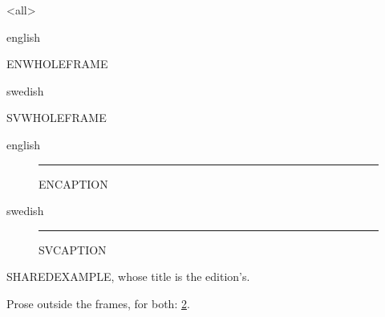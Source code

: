 \mode<all>
\begin{onlyin}{english}
\begin{frame}
ENWHOLEFRAME
\end{frame}
\end{onlyin}
\begin{onlyin}{swedish}
\begin{frame}
SVWHOLEFRAME
\end{frame}
\end{onlyin}
\mode*

\begin{onlyin}{english}
\begin{figure}
\rule{1cm}{1cm}
\caption{ENCAPTION}\label{fig:same}
\end{figure}
\end{onlyin}
\begin{onlyin}{swedish}
\begin{figure}
\rule{1cm}{1cm}
\caption{SVCAPTION}\label{fig:same}
\end{figure}
\end{onlyin}

\begin{frame}
\end{frame}

\begin{frame}
  \begin{example}
    SHAREDEXAMPLE, whose title is the edition's.
  \end{example}
\end{frame}

Prose outside the frames, for both: \cref{fig:same}.



